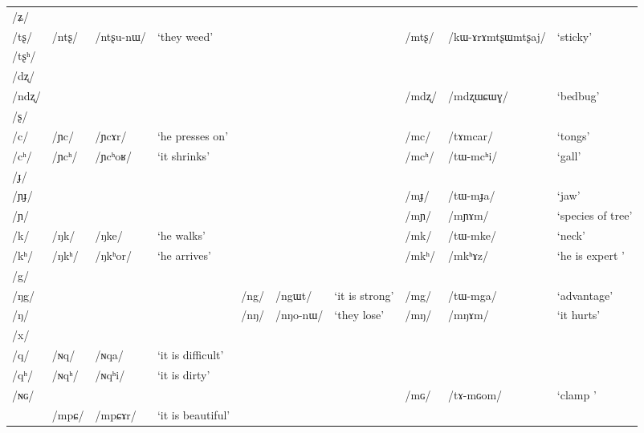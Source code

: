 \documentclass[oneside,a4paper,11pt]{article}
\newcommand{\ipa}[1]{\mbox{\phon/#1/}}
\newcommand{\deux}[1]{\ipa{#1}\addtocounter{2clusters}{1}}
\newcommand{\trois}[1]{\ipa{#1}\addtocounter{3clusters}{1}}
\newcommand{\resetcounters}[2]{
\newcounter{#1}
\newcounter{#2}
 \setcounter{#1}{\value{2clusters}}
  \setcounter{#2}{\value{3clusters}}
 \setcounter{2clusters}{0}
  \setcounter{3clusters}{0}
}
\begin{document}
\begin{table}
{\begin{tabular}{llllllllll}
\ipa{ʑ} & & & & & & & & & \\
\ipa{tʂ} & \deux{ntʂ} & \ipa{ntʂu-nɯ} & `they weed' & & & & \deux{mtʂ} & \ipa{kɯ-ɤrɤmtʂɯmtʂaj} & `sticky' \\
\ipa{tʂʰ} & & & & & & & & & \\
\ipa{dʐ} & & & & & & & & & \\
\ipa{ndʐ} & & & & & & & \deux{mdʐ} & \ipa{mdʐɯɕɯɣ} & `bedbug' \\
\ipa{ʂ} & & & & & & & & & \\
\ipa{c} & \deux{ɲc} & \ipa{ɲcɤr} & `he presses on' & & & & \deux{mc} & \ipa{tɤmcar} & `tongs' \\
\ipa{cʰ} & \deux{ɲcʰ} & \ipa{ɲcʰoʁ} & `it shrinks' & & & & \deux{mcʰ} & \ipa{tɯ-mcʰi} & `gall' \\
\ipa{ɟ} & & & & & & & & & \\
\ipa{ɲɟ} & & & & & & & \deux{mɟ} & \ipa{tɯ-mɟa} & `jaw' \\
\ipa{ɲ} & & & & & & & \deux{mɲ} & \ipa{mɲɤm} & `species of tree' \\
\ipa{k} & \deux{ŋk} & \ipa{ŋke} & `he walks' & & & & \deux{mk} & \ipa{tɯ-mke} & `neck' \\
\ipa{kʰ} & \deux{ŋkʰ} & \ipa{ŋkʰor} & `he arrives' & & & & \deux{mkʰ} & \ipa{mkʰɤz} & `he is expert ' \\
\ipa{g} & & & & & & & & & \\
\ipa{ŋg} & & & & \deux{ng} & \ipa{ngɯt} & `it is strong' & \deux{mg} & \ipa{tɯ-mga} & `advantage' \\
\ipa{ŋ} & & & & \deux{nŋ} & \ipa{nŋo-nɯ} & `they lose' & \deux{mŋ} & \ipa{mŋɤm} & `it hurts' \\
\ipa{x} & & & & & & & & & \\
\ipa{q} & \deux{ɴq} & \ipa{ɴqa} & `it is difficult' & & & & & &\\
\ipa{qʰ} & \deux{ɴqʰ} & \ipa{ɴqʰi} & `it is dirty' & & & & & &\\
\ipa{ɴɢ} & & & & & & & \deux{mɢ} & \ipa{tɤ-mɢom} & `clamp ' \\
\midrule
&\trois{mpɕ} &\ipa{mpɕɤr} & `it is beautiful' \\
\bottomrule
\end{tabular}}
\end{table} 
 \resetcounters{2nC}{3nC} %
 
  
  
\end{document}
